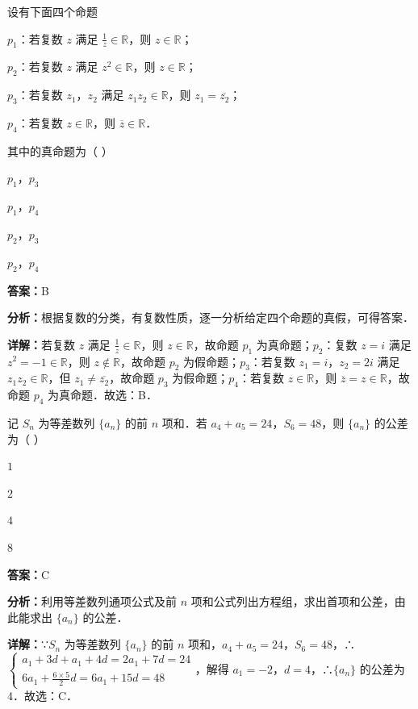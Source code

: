 \begin{question}[points=5]
设有下面四个命题



$p_1$：若复数 $z$ 满足 $\frac{1}{z}\in\mathbb{R}$，则 $z\in\mathbb{R}$；



$p_2$：若复数 $z$ 满足 $z^2\in\mathbb{R}$，则 $z\in\mathbb{R}$；



$p_3$：若复数 $z_1$，$z_2$ 满足 $z_1z_2\in\mathbb{R}$，则 $z_1=\overline{z_2}$；



$p_4$：若复数 $z\in\mathbb{R}$，则 $\overline{z}\in\mathbb{R}$．

其中的真命题为（ ）
\begin{choices}
  \item $p_1$，$p_3$
  \item $p_1$，$p_4$
  \item $p_2$，$p_3$
  \item $p_2$，$p_4$
\end{choices}
\begin{solution}
\textbf{答案：}B

\textbf{分析：}根据复数的分类，有复数性质，逐一分析给定四个命题的真假，可得答案．

\textbf{详解：}若复数 $z$ 满足 $\frac{1}{z}\in\mathbb{R}$，则 $z\in\mathbb{R}$，故命题 $p_1$ 为真命题；$p_2$：复数 $z=i$ 满足 $z^2=-1\in\mathbb{R}$，则 $z\notin\mathbb{R}$，故命题 $p_2$ 为假命题；$p_3$：若复数 $z_1=i$，$z_2=2i$ 满足 $z_1z_2\in\mathbb{R}$，但 $z_1\neq \overline{z_2}$，故命题 $p_3$ 为假命题；$p_4$：若复数 $z\in\mathbb{R}$，则 $\overline{z}=z\in\mathbb{R}$，故命题 $p_4$ 为真命题．故选：B．
\end{solution}
\end{question}

\begin{question}[points=5]
记 $S_n$ 为等差数列 $\{a_n\}$ 的前 $n$ 项和．若 $a_4+a_5=24$，$S_6=48$，则 $\{a_n\}$ 的公差为（ ）
\begin{choices}
  \item $1$
  \item $2$
  \item $4$
  \item $8$
\end{choices}
\begin{solution}
\textbf{答案：}C

\textbf{分析：}利用等差数列通项公式及前 $n$ 项和公式列出方程组，求出首项和公差，由此能求出 $\{a_n\}$ 的公差．

\textbf{详解：}∵$S_n$ 为等差数列 $\{a_n\}$ 的前 $n$ 项和，$a_4+a_5=24$，$S_6=48$，∴$\begin{cases} a_1+3d+a_1+4d=2a_1+7d=24 \\ 6a_1+\frac{6\times5}{2}d=6a_1+15d=48 \end{cases}$，解得 $a_1=-2$，$d=4$，∴$\{a_n\}$ 的公差为 4．故选：C．
\end{solution}
\end{question}

